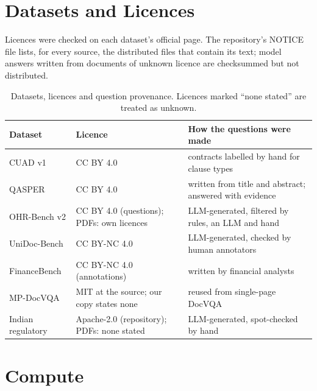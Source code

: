 \begin{table}[!htb]
\centering
{}
\caption{Pre-registration timeline in Indian Standard Time (month-day). ``--'': not a push event (runs) or no push in
the activity log read for this paper (the paper tag).}
\label{tab:a3}
\end{table}

\FloatBarrier
\section{Datasets and Licences}
\label{app:datasets}

Licences were checked on each dataset's official page. The repository's
NOTICE file lists, for every source, the distributed files that contain
its text; model answers written from documents of unknown licence are
checksummed but not distributed.

\begin{table}[!htb]
\centering
\begin{tabularx}{\textwidth}{lXX}
\toprule
Dataset & Licence & How the questions were made \\
\midrule
CUAD v1 \citep{hendrycks2021cuad} & CC BY 4.0 & contracts labelled by hand for clause types \\
QASPER \citep{dasigi2021qasper} & CC BY 4.0 & written from title and abstract; answered with evidence \\
OHR-Bench v2 \citep{zhang2024ocr} & CC BY 4.0 (questions); PDFs: own licences & LLM-generated, filtered by rules, an LLM and hand \\
UniDoc-Bench \citep{peng2025unidoc} & CC BY-NC 4.0 & LLM-generated, checked by human annotators \\
FinanceBench \citep{islam2023financebench} & CC BY-NC 4.0 (annotations) & written by financial analysts \\
MP-DocVQA \citep{tito2023mpdocvqa} & MIT at the source; our copy states none & reused from single-page DocVQA \\
Indian regulatory \citep{singh2026parser} & Apache-2.0 (repository); PDFs: none stated & LLM-generated, spot-checked by hand \\
\bottomrule
\end{tabularx}
\caption{Datasets, licences and question provenance. Licences marked ``none stated'' are treated as unknown.}
\label{tab:a4}
\end{table}

\FloatBarrier
\section{Compute}
\label{app:compute}
\begin{table}[!htb]
\centering
{}
\caption{Compute from the run records (wall-clock hours of recorded stages).}
\label{tab:a5}
\end{table}

